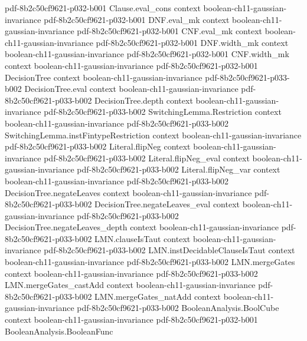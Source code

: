 \begin{lemma}
  {pdf-8b2c50cf9621-p032-b001}
\proofstep
  {Clause.eval_cons}
  {context}
  {boolean-ch11-gaussian-invariance}
  {pdf-8b2c50cf9621-p032-b001}
\proofstep
  {DNF.eval_mk}
  {context}
  {boolean-ch11-gaussian-invariance}
  {pdf-8b2c50cf9621-p032-b001}
\proofstep
  {CNF.eval_mk}
  {context}
  {boolean-ch11-gaussian-invariance}
  {pdf-8b2c50cf9621-p032-b001}
\proofstep
  {DNF.width_mk}
  {context}
  {boolean-ch11-gaussian-invariance}
  {pdf-8b2c50cf9621-p032-b001}
\proofstep
  {CNF.width_mk}
  {context}
  {boolean-ch11-gaussian-invariance}
  {pdf-8b2c50cf9621-p032-b001}
\proofstep
  {DecisionTree}
  {context}
  {boolean-ch11-gaussian-invariance}
  {pdf-8b2c50cf9621-p033-b002}
\proofstep
  {DecisionTree.eval}
  {context}
  {boolean-ch11-gaussian-invariance}
  {pdf-8b2c50cf9621-p033-b002}
\proofstep
  {DecisionTree.depth}
  {context}
  {boolean-ch11-gaussian-invariance}
  {pdf-8b2c50cf9621-p033-b002}
\proofstep
  {SwitchingLemma.Restriction}
  {context}
  {boolean-ch11-gaussian-invariance}
  {pdf-8b2c50cf9621-p033-b002}
\proofstep
  {SwitchingLemma.instFintypeRestriction}
  {context}
  {boolean-ch11-gaussian-invariance}
  {pdf-8b2c50cf9621-p033-b002}
\proofstep
  {Literal.flipNeg}
  {context}
  {boolean-ch11-gaussian-invariance}
  {pdf-8b2c50cf9621-p033-b002}
\proofstep
  {Literal.flipNeg_eval}
  {context}
  {boolean-ch11-gaussian-invariance}
  {pdf-8b2c50cf9621-p033-b002}
\proofstep
  {Literal.flipNeg_var}
  {context}
  {boolean-ch11-gaussian-invariance}
  {pdf-8b2c50cf9621-p033-b002}
\proofstep
  {DecisionTree.negateLeaves}
  {context}
  {boolean-ch11-gaussian-invariance}
  {pdf-8b2c50cf9621-p033-b002}
\proofstep
  {DecisionTree.negateLeaves_eval}
  {context}
  {boolean-ch11-gaussian-invariance}
  {pdf-8b2c50cf9621-p033-b002}
\proofstep
  {DecisionTree.negateLeaves_depth}
  {context}
  {boolean-ch11-gaussian-invariance}
  {pdf-8b2c50cf9621-p033-b002}
\proofstep
  {LMN.clauseIsTaut}
  {context}
  {boolean-ch11-gaussian-invariance}
  {pdf-8b2c50cf9621-p033-b002}
\proofstep
  {LMN.instDecidableClauseIsTaut}
  {context}
  {boolean-ch11-gaussian-invariance}
  {pdf-8b2c50cf9621-p033-b002}
\proofstep
  {LMN.mergeGates}
  {context}
  {boolean-ch11-gaussian-invariance}
  {pdf-8b2c50cf9621-p033-b002}
\proofstep
  {LMN.mergeGates_castAdd}
  {context}
  {boolean-ch11-gaussian-invariance}
  {pdf-8b2c50cf9621-p033-b002}
\proofstep
  {LMN.mergeGates_natAdd}
  {context}
  {boolean-ch11-gaussian-invariance}
  {pdf-8b2c50cf9621-p033-b002}
\proofstep
  {BooleanAnalysis.BoolCube}
  {context}
  {boolean-ch11-gaussian-invariance}
  {pdf-8b2c50cf9621-p032-b001}
\proofstep
  {BooleanAnalysis.BooleanFunc}

\end{lemma}
